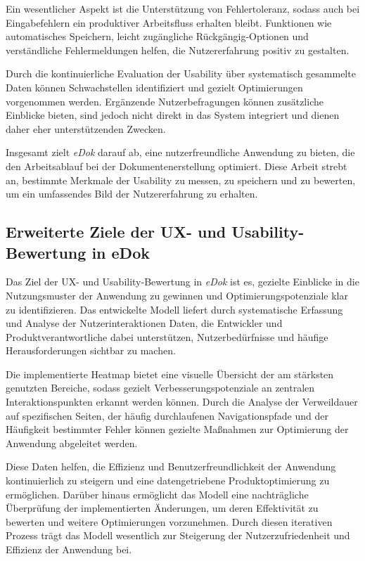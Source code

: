 \documentclass[12pt,oneside]{article}
\begin{document}
Ein wesentlicher Aspekt ist die Unterstützung von Fehlertoleranz, sodass auch bei Eingabefehlern ein produktiver Arbeitsfluss erhalten bleibt. Funktionen wie automatisches Speichern, leicht zugängliche Rückgängig-Optionen und verständliche Fehlermeldungen helfen, die Nutzererfahrung positiv zu gestalten.

Durch die kontinuierliche Evaluation der Usability über systematisch gesammelte Daten können Schwachstellen identifiziert und gezielt Optimierungen vorgenommen werden. Ergänzende Nutzerbefragungen können zusätzliche Einblicke bieten, sind jedoch nicht direkt in das System integriert und dienen daher eher unterstützenden Zwecken.

Insgesamt zielt \textit{eDok} darauf ab, eine nutzerfreundliche Anwendung zu bieten, die den Arbeitsablauf bei der Dokumentenerstellung optimiert. Diese Arbeit strebt an, bestimmte Merkmale der Usability zu messen, zu speichern und zu bewerten, um ein umfassendes Bild der Nutzererfahrung zu erhalten.

\subsection{Erweiterte Ziele der UX- und Usability-Bewertung in eDok}

Das Ziel der UX- und Usability-Bewertung in \textit{eDok} ist es, gezielte Einblicke in die Nutzungsmuster der Anwendung zu gewinnen und Optimierungspotenziale klar zu identifizieren. Das entwickelte Modell liefert durch systematische Erfassung und Analyse der Nutzerinteraktionen Daten, die Entwickler und Produktverantwortliche dabei unterstützen, Nutzerbedürfnisse und häufige Herausforderungen sichtbar zu machen.

Die implementierte Heatmap bietet eine visuelle Übersicht der am stärksten genutzten Bereiche, sodass gezielt Verbesserungspotenziale an zentralen Interaktionspunkten erkannt werden können. Durch die Analyse der Verweildauer auf spezifischen Seiten, der häufig durchlaufenen Navigationspfade und der Häufigkeit bestimmter Fehler können gezielte Maßnahmen zur Optimierung der Anwendung abgeleitet werden.

Diese Daten helfen, die Effizienz und Benutzerfreundlichkeit der Anwendung kontinuierlich zu steigern und eine datengetriebene Produktoptimierung zu ermöglichen. Darüber hinaus ermöglicht das Modell eine nachträgliche Überprüfung der implementierten Änderungen, um deren Effektivität zu bewerten und weitere Optimierungen vorzunehmen. Durch diesen iterativen Prozess trägt das Modell wesentlich zur Steigerung der Nutzerzufriedenheit und Effizienz der Anwendung bei.
\end{document}
